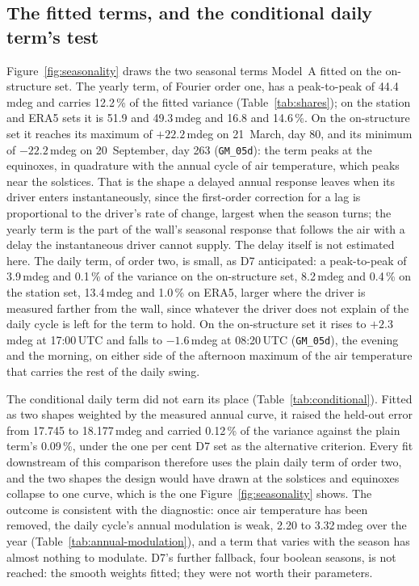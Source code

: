 \documentclass[11pt,a4paper]{article}
\begin{document}
\subsection{The fitted terms, and the conditional daily term's test}
\label{sec:seasonal-fitted}

Figure~\ref{fig:seasonality} draws the two seasonal terms Model~A fitted on
the on-structure set. The yearly term, of Fourier order one, has a
peak-to-peak of 44.4\,mdeg and carries 12.2\,\% of the fitted variance
(Table~\ref{tab:shares}); on the station and ERA5 sets it is 51.9 and
49.3\,mdeg and 16.8 and 14.6\,\%. On the on-structure set it reaches its
maximum of $+22.2$\,mdeg on 21~March, day 80, and its minimum of
$-22.2$\,mdeg on 20~September, day 263 (\texttt{GM\_05d}): the term peaks at
the equinoxes, in quadrature with the annual cycle of air temperature, which
peaks near the solstices. That is the shape a delayed annual response leaves
when its driver enters instantaneously, since the first-order correction for
a lag is proportional to the driver's rate of change, largest when the
season turns; the yearly term is the part of the wall's seasonal response
that follows the air with a delay the instantaneous driver cannot supply.
The delay itself is not estimated here. The daily term, of order two, is
small, as D7 anticipated: a peak-to-peak of 3.9\,mdeg and 0.1\,\% of the
variance on the on-structure set, 8.2\,mdeg and 0.4\,\% on the station set,
13.4\,mdeg and 1.0\,\% on ERA5, larger where the driver is measured farther
from the wall, since whatever the driver does not explain of the daily cycle
is left for the term to hold. On the on-structure set it rises to
$+2.3$\,mdeg at 17:00\,UTC and falls to $-1.6$\,mdeg at 08:20\,UTC
(\texttt{GM\_05d}), the evening and the morning, on either side of the
afternoon maximum of the air temperature that carries the rest of the daily
swing.

The conditional daily term did not earn its place
(Table~\ref{tab:conditional}). Fitted as two shapes weighted by the measured
annual curve, it raised the held-out error from 17.745 to 18.177\,mdeg and
carried 0.12\,\% of the variance against the plain term's 0.09\,\%, under the
one per cent D7 set as the alternative criterion. Every fit downstream of
this comparison therefore uses the plain daily term of order two, and the two
shapes the design would have drawn at the solstices and equinoxes collapse to
one curve, which is the one Figure~\ref{fig:seasonality} shows. The outcome
is consistent with the diagnostic: once air temperature has been removed, the
daily cycle's annual modulation is weak, 2.20 to 3.32\,mdeg over the year
(Table~\ref{tab:annual-modulation}), and a term that varies with the season
has almost nothing to modulate. D7's further fallback, four boolean seasons,
is not reached: the smooth weights fitted; they were not worth their
parameters.
\end{document}
